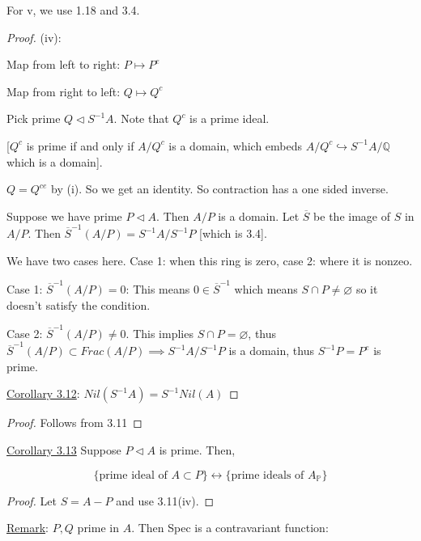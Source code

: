 \documentclass{article}
\theoremstyle{definition}
\begin{document}
For v, we use 1.18 and 3.4.

\begin{proof}
    (iv):

    Map from left to right: \(P \mapsto P^e\) 

    Map from right to left: \(Q \mapsto Q^c\) 

    Pick prime \(Q \triangleleft S ^{-1} A\). Note that \(Q^c\) is a prime ideal.

    [\(Q^c\) is prime if and only if \(A / Q^c\) is a domain, which embeds \(A / Q^c \hookrightarrow S ^{-1} A / \mathbb{Q}\) which is a domain].

    \(Q = Q^{ce}\) by (i). So we get an identity. So contraction has a one sided inverse.

    Suppose we have prime \(P \triangleleft A\). Then \(A / P\) is a domain. Let \(\overline{S} \) be the image of \(S\) in \(A / P\). Then \(\overline{S} ^{-1} (A / P) = S ^{-1} A / S ^{-1} P\) [which is 3.4].

    We have two cases here. Case 1: when this ring is zero, case 2: where it is nonzeo.

    Case 1: \(\overline{S} ^{-1}  (A / P) = 0\): This means \(0 \in \overline{S} ^{-1} \) which means \(S \cap P \neq \varnothing \) so it doesn't satisfy the condition.
    
    Case 2: \(\overline{S} ^{-1} (A / P) \neq 0\). This implies \(S \cap P = \varnothing\), thus \(\overline{S} ^{-1} (A / P) \subset Frac(A / P) \implies S ^{-1} A / S ^{-1} P\) is a domain, thus \(S ^{-1} P=P^e\) is prime.
    
    \underline{Corollary 3.12}: \(Nil(S ^{-1} A) = S ^{-1} Nil(A)\)
    
\end{proof}

\begin{proof}
    Follows from 3.11
\end{proof}


\underline{Corollary 3.13} Suppose \(P \triangleleft A\) is prime. Then,

\[
    \{ \text{prime ideal of } A \subset P \} \longleftrightarrow \{ \text{prime ideals of } A_{\mathbb{P}} \} 
\]

\begin{proof}
    Let \(S = A - P\) and use 3.11(iv).
\end{proof}

\underline{Remark}: \(P,Q\) prime in \(A\). Then Spec is a contravariant function:
\end{document}
